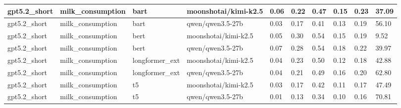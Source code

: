 \begin{tabular}{|l|l|l|l|l|l|l|l|l|l|}
 \hline
 gpt5.2\_short & milk\_consumption & bart & moonshotai/kimi-k2.5 & 0.06 & 0.22 & 0.47 & 0.15 & 0.23 & 37.09 \\
 \hline
 gpt5.2\_short & milk\_consumption & bart & qwen/qwen3.5-27b & 0.03 & 0.17 & 0.41 & 0.13 & 0.19 & 56.10 \\
 \hline
 gpt5.2\_short & milk\_consumption & bert & moonshotai/kimi-k2.5 & 0.05 & 0.30 & 0.54 & 0.15 & 0.19 & 9.52 \\
 \hline
 gpt5.2\_short & milk\_consumption & bert & qwen/qwen3.5-27b & 0.07 & 0.28 & 0.54 & 0.18 & 0.22 & 39.97 \\
 \hline
 gpt5.2\_short & milk\_consumption & longformer\_ext & moonshotai/kimi-k2.5 & 0.04 & 0.23 & 0.50 & 0.12 & 0.18 & 42.88 \\
 \hline
 gpt5.2\_short & milk\_consumption & longformer\_ext & qwen/qwen3.5-27b & 0.04 & 0.21 & 0.49 & 0.16 & 0.20 & 62.80 \\
 \hline
 gpt5.2\_short & milk\_consumption & t5 & moonshotai/kimi-k2.5 & 0.03 & 0.17 & 0.42 & 0.11 & 0.17 & 47.49 \\
 \hline
 gpt5.2\_short & milk\_consumption & t5 & qwen/qwen3.5-27b & 0.01 & 0.13 & 0.34 & 0.10 & 0.16 & 70.81 \\
\hline
\end{tabular}
